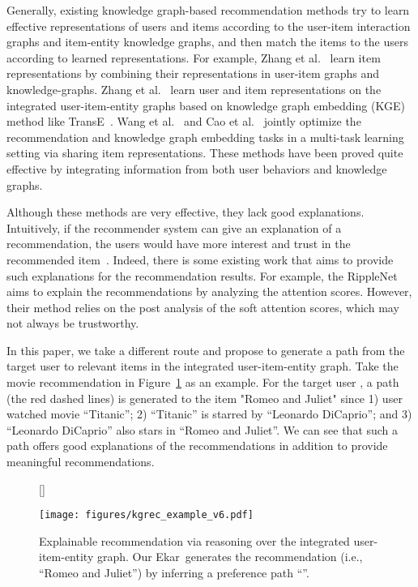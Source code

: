\documentclass{article}
\newcommand{\name}{Ekar}
\begin{document}
Generally, existing knowledge graph-based recommendation methods try to learn effective representations of users and items according to the user-item interaction graphs and item-entity knowledge graphs, and then match the items to the users according to learned representations. For example, Zhang et al.~\cite{zhang2016collaborative} learn item representations by combining their representations in user-item graphs and knowledge-graphs. 
Zhang et al.~\cite{zhang2018learning} learn user and item representations on the integrated user-item-entity graphs based on knowledge graph embedding (KGE) method like TransE~\cite{bordes2013translating}. Wang et al.~\cite{Wang_2019} and Cao et al.~\cite{Cao_2019} jointly optimize the recommendation and knowledge graph embedding tasks in a multi-task learning setting via sharing item representations. These methods have been proved quite effective by integrating information from both user behaviors and knowledge graphs.



Although these methods are very effective, they lack good explanations. Intuitively, if the recommender system can give an explanation of a recommendation, the users would have more interest and trust in the recommended item~\cite{herlocker2000explaining, lu2018like,zhang2018explainable,zhang2014explicit}. 
Indeed, there is some existing work that aims to provide such explanations for the recommendation results. For example, the RippleNet~\cite{wang2018ripplenet} aims to explain the recommendations by analyzing the attention scores. However, their method relies on the post analysis of the soft attention scores, which may not always be trustworthy. 





In this paper, we take a different route and propose to generate a path from the target user to relevant items in the integrated user-item-entity graph. Take the movie recommendation in Figure~\ref{fig:example} as an example. For the target user , a path (the red dashed lines) is generated to the item "Romeo and Juliet" since 1) user  watched movie ``Titanic''; 2) ``Titanic'' is starred by ``Leonardo DiCaprio''; and 3) ``Leonardo DiCaprio'' also stars in ``Romeo and Juliet''. We can see that such a path
offers good explanations of the recommendations in addition to provide meaningful recommendations.




\begin{figure}
[\FBwidth]
{\caption{Explainable recommendation via reasoning over the integrated user-item-entity graph. Our \name\ generates the recommendation (i.e., ``Romeo and Juliet'') by inferring a preference path ``''.}\label{fig:example}}
{\texttt{[image: figures/kgrec\_example\_v6.pdf]}}
\end{figure}
\end{document}
